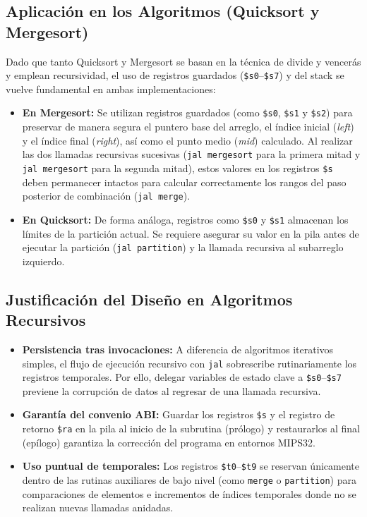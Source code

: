 \documentclass[12pt,a4paper]{article}
\begin{document}
	\subsection{Aplicación en los Algoritmos (Quicksort y Mergesort)}
	Dado que tanto Quicksort y Mergesort se basan en la técnica de divide y vencerás y emplean recursividad, el uso de registros guardados (\texttt{\$s0}--\texttt{\$s7}) y del stack se vuelve fundamental en ambas implementaciones:
	\begin{itemize}
		\item \textbf{En Mergesort:} Se utilizan registros guardados (como \texttt{\$s0}, \texttt{\$s1} y \texttt{\$s2}) para preservar de manera segura el puntero base del arreglo, el índice inicial (\textit{left}) y el índice final (\textit{right}), así como el punto medio (\textit{mid}) calculado. Al realizar las dos llamadas recursivas sucesivas (\texttt{jal mergesort} para la primera mitad y \texttt{jal mergesort} para la segunda mitad), estos valores en los registros \texttt{\$s} deben permanecer intactos para calcular correctamente los rangos del paso posterior de combinación (\texttt{jal merge}).
		\item \textbf{En Quicksort:} De forma análoga, registros como \texttt{\$s0} y \texttt{\$s1} almacenan los límites de la partición actual. Se requiere asegurar su valor en la pila antes de ejecutar la partición (\texttt{jal partition}) y la llamada recursiva al subarreglo izquierdo.
	\end{itemize}
	
	\subsection{Justificación del Diseño en Algoritmos Recursivos}
	\begin{itemize}
		\item \textbf{Persistencia tras invocaciones:} A diferencia de algoritmos iterativos simples, el flujo de ejecución recursivo con \texttt{jal} sobrescribe rutinariamente los registros temporales. Por ello, delegar variables de estado clave a \texttt{\$s0}--\texttt{\$s7} previene la corrupción de datos al regresar de una llamada recursiva.
		\item \textbf{Garantía del convenio ABI:} Guardar los registros \texttt{\$s} y el registro de retorno \texttt{\$ra} en la pila al inicio de la subrutina (prólogo) y restaurarlos al final (epílogo) garantiza la corrección del programa en entornos MIPS32.
		\item \textbf{Uso puntual de temporales:} Los registros \texttt{\$t0}--\texttt{\$t9} se reservan únicamente dentro de las rutinas auxiliares de bajo nivel (como \texttt{merge} o \texttt{partition}) para comparaciones de elementos e incrementos de índices temporales donde no se realizan nuevas llamadas anidadas.
	\end{itemize}
	
\end{document}
